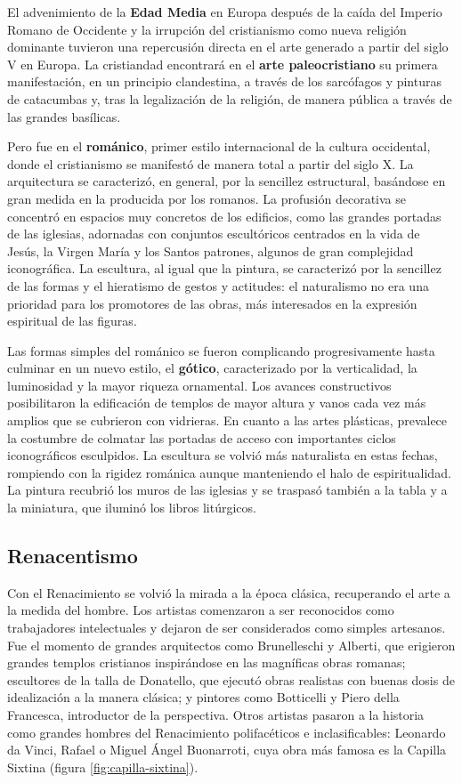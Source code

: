 El advenimiento de la \textbf{Edad Media} en Europa después de la caída del Imperio Romano de Occidente y la irrupción del cristianismo como nueva religión dominante tuvieron una repercusión directa en el arte generado a partir del siglo V en Europa. La cristiandad encontrará en el \textbf{arte paleocristiano} su primera manifestación, en un principio clandestina, a través de los sarcófagos y pinturas de catacumbas y, tras la legalización de la religión, de manera pública a través de las grandes basílicas. 

Pero fue en el \textbf{románico}, primer estilo internacional de la cultura occidental, donde el cristianismo se manifestó de manera total a partir del siglo X. La arquitectura se caracterizó, en general, por la sencillez estructural, basándose en gran medida en la producida por los romanos. La profusión decorativa se concentró en espacios muy concretos de los edificios, como las grandes portadas de las iglesias, adornadas con conjuntos escultóricos centrados en la vida de Jesús, la Virgen María y los Santos patrones, algunos de gran complejidad iconográfica. La escultura, al igual que la pintura, se caracterizó por la sencillez de las formas y el hieratismo de gestos y actitudes: el naturalismo no era una prioridad para los promotores de las obras, más interesados en la expresión espiritual de las figuras.

Las formas simples del románico se fueron complicando progresivamente hasta culminar en un nuevo estilo, el \textbf{gótico}, caracterizado por la verticalidad, la luminosidad y la mayor riqueza ornamental. Los avances constructivos posibilitaron la edificación de templos de mayor altura y vanos cada vez más amplios que se cubrieron con vidrieras. En cuanto a las artes plásticas, prevalece la costumbre de colmatar las portadas de acceso con importantes ciclos iconográficos esculpidos. La escultura se volvió más naturalista en estas fechas, rompiendo con la rigidez románica aunque manteniendo el halo de espiritualidad. La pintura recubrió los muros de las iglesias y se traspasó también a la tabla y a la miniatura, que iluminó los libros litúrgicos.

\subsection{Renacentismo}

Con el Renacimiento se volvió la mirada a la época clásica, recuperando el arte a la medida del hombre. Los artistas comenzaron a ser reconocidos como trabajadores intelectuales y dejaron de ser considerados como simples artesanos. Fue el momento de grandes arquitectos como Brunelleschi y Alberti, que erigieron grandes templos cristianos inspirándose en las magníficas obras romanas; escultores de la talla de Donatello, que ejecutó obras realistas con buenas dosis de idealización a la manera clásica; y pintores como Botticelli y Piero della Francesca, introductor de la perspectiva. Otros artistas pasaron a la historia como grandes hombres del Renacimiento polifacéticos e inclasificables: Leonardo da Vinci, Rafael o Miguel Ángel Buonarroti, cuya obra más famosa es la Capilla Sixtina (figura \ref{fig:capilla-sixtina}). 

